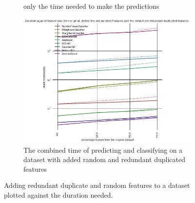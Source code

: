 \documentclass[a4paper,10pt]{article}
\begin{document}
\begin{figure}[H]
\begin{subfigure}[b]{0.45\textwidth}
		\caption{only the time needed to make the predictions}
		\label{fig:SADRP}
	\end{subfigure}
	\begin{subfigure}[b]{0.45\textwidth}
		\includegraphics[width=\textwidth]{images/scalability/FeatAddDupRand.png}
		\caption{The combined time of predicting and classifying on a dataset with added random and redundant duplicated features}
		\label{fig:SADR}
	\end{subfigure}
	\caption{Adding redundant duplicate and random features to a dataset plotted against the duration needed.}
	\label{fig:ScalableAdded}
\end{figure}
\end{document}
